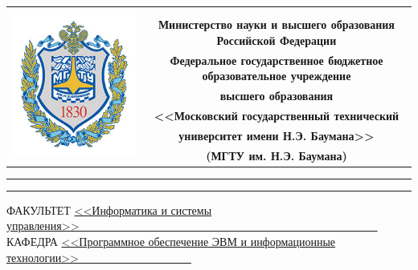 \begin{table}[H]
    \centering
    \footnotesize
    \begin{tabular}{cc}
        \multirow{8}{*}{\includegraphics[scale=0.35]{img/titlepage/bmstu.jpg}}
        & \\
        & \\
        & \textbf{Министерство науки и высшего образования Российской Федерации} \\
        & \textbf{Федеральное государственное бюджетное образовательное учреждение} \\
        & \textbf{высшего образования} \\
        & \textbf{<<Московский государственный технический} \\
        & \textbf{университет имени Н.Э. Баумана>>} \\
        & \textbf{(МГТУ им. Н.Э. Баумана)} \\
    \end{tabular}
\end{table}

\vspace{-2.5cm}

\begin{flushleft}
    \rule[-1cm]{\textwidth}{3pt}
    \rule{\textwidth}{1pt}
\end{flushleft}

\begin{flushleft}
    \small
    ФАКУЛЬТЕТ
    \underline{<<Информатика и системы управления>>\ \ \ \ \ \ \ \ \ \ \ \ \ \ \ \ \ \ \ \ \ \ \ \ \ \ \ \ \ \ \ \ \ \ \ \ \ \ \ \ \ \ \ \ \ \ \ \ \ \ \ \ \ } \\
    КАФЕДРА
    \underline{<<Программное обеспечение ЭВМ и информационные технологии>>\ \ \ \ \ \ \ \ \ \ \ \ \ \ \ \ \ \ \ \ }
\end{flushleft}

\vspace{2cm}
